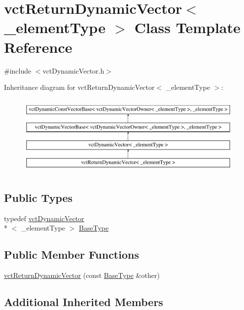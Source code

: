 \hypertarget{classvct_return_dynamic_vector}{\section{vct\-Return\-Dynamic\-Vector$<$ \-\_\-element\-Type $>$ Class Template Reference}
\label{classvct_return_dynamic_vector}
}


{\ttfamily \#include $<$vct\-Dynamic\-Vector.\-h$>$}

Inheritance diagram for vct\-Return\-Dynamic\-Vector$<$ \-\_\-element\-Type $>$\-:\begin{figure}[H]
\begin{center}
\leavevmode
\includegraphics[height=4.000000cm]{d9/dcb/classvct_return_dynamic_vector}
\end{center}
\end{figure}
\subsection*{Public Types}
\begin{DoxyCompactItemize}
\item 
typedef \hyperlink{classvct_dynamic_vector}{vct\-Dynamic\-Vector}\\*
$<$ \-\_\-element\-Type $>$ \hyperlink{classvct_return_dynamic_vector_aec5f994308da32f15af397a1f89ca23d}{Base\-Type}
\end{DoxyCompactItemize}
\subsection*{Public Member Functions}
\begin{DoxyCompactItemize}
\item 
\hyperlink{classvct_return_dynamic_vector_a5df1d2e9fe43ee64b25125657618b8bd}{vct\-Return\-Dynamic\-Vector} (const \hyperlink{classvct_dynamic_vector_aab0ea4a1ec16f7694beb39869ab780bf}{Base\-Type} \&other)
\end{DoxyCompactItemize}
\subsection*{Additional Inherited Members}


